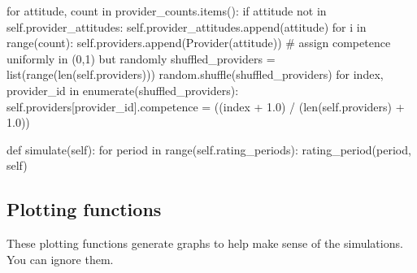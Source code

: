 \documentclass[
  letterpaper,
  DIV=11,
  numbers=noendperiod]{scrartcl}
\newenvironment{Shaded}{\begin{snugshade}}{\end{snugshade}}
\newcommand{\BuiltInTok}[1]{\textcolor[rgb]{0.00,0.23,0.31}{#1}}
\newcommand{\CommentTok}[1]{\textcolor[rgb]{0.37,0.37,0.37}{#1}}
\newcommand{\ControlFlowTok}[1]{\textcolor[rgb]{0.00,0.23,0.31}{#1}}
\newcommand{\FloatTok}[1]{\textcolor[rgb]{0.68,0.00,0.00}{#1}}
\newcommand{\KeywordTok}[1]{\textcolor[rgb]{0.00,0.23,0.31}{#1}}
\newcommand{\NormalTok}[1]{\textcolor[rgb]{0.00,0.23,0.31}{#1}}
\newcommand{\OperatorTok}[1]{\textcolor[rgb]{0.37,0.37,0.37}{#1}}
\newcommand{\VariableTok}[1]{\textcolor[rgb]{0.07,0.07,0.07}{#1}}
\begin{document}
\begin{Shaded}
\begin{Highlighting}[]
        \ControlFlowTok{for}\NormalTok{ attitude, count }\KeywordTok{in}\NormalTok{ provider\_counts.items():}
            \ControlFlowTok{if}\NormalTok{ attitude }\KeywordTok{not} \KeywordTok{in} \VariableTok{self}\NormalTok{.provider\_attitudes:}
                \VariableTok{self}\NormalTok{.provider\_attitudes.append(attitude)}
            \ControlFlowTok{for}\NormalTok{ i }\KeywordTok{in} \BuiltInTok{range}\NormalTok{(count):}
                \VariableTok{self}\NormalTok{.providers.append(Provider(attitude))}
        \CommentTok{\# assign competence uniformly in (0,1) but randomly }
\NormalTok{        shuffled\_providers }\OperatorTok{=} \BuiltInTok{list}\NormalTok{(}\BuiltInTok{range}\NormalTok{(}\BuiltInTok{len}\NormalTok{(}\VariableTok{self}\NormalTok{.providers)))}
\NormalTok{        random.shuffle(shuffled\_providers)}
        \ControlFlowTok{for}\NormalTok{ index, provider\_id }\KeywordTok{in} \BuiltInTok{enumerate}\NormalTok{(shuffled\_providers):}
            \VariableTok{self}\NormalTok{.providers[provider\_id].competence }\OperatorTok{=}\NormalTok{ ((index }\OperatorTok{+} \FloatTok{1.0}\NormalTok{) }\OperatorTok{/}
\NormalTok{                                                      (}\BuiltInTok{len}\NormalTok{(}\VariableTok{self}\NormalTok{.providers) }\OperatorTok{+} \FloatTok{1.0}\NormalTok{))}
        
    \KeywordTok{def}\NormalTok{ simulate(}\VariableTok{self}\NormalTok{):}
        \ControlFlowTok{for}\NormalTok{ period }\KeywordTok{in} \BuiltInTok{range}\NormalTok{(}\VariableTok{self}\NormalTok{.rating\_periods):}
\NormalTok{            rating\_period(period, }\VariableTok{self}\NormalTok{)}
\end{Highlighting}
\end{Shaded}

\hypertarget{plotting-functions}{%
\subsection{Plotting functions}\label{plotting-functions}}

These plotting functions generate graphs to help make sense of the
simulations. You can ignore them.
\end{document}
